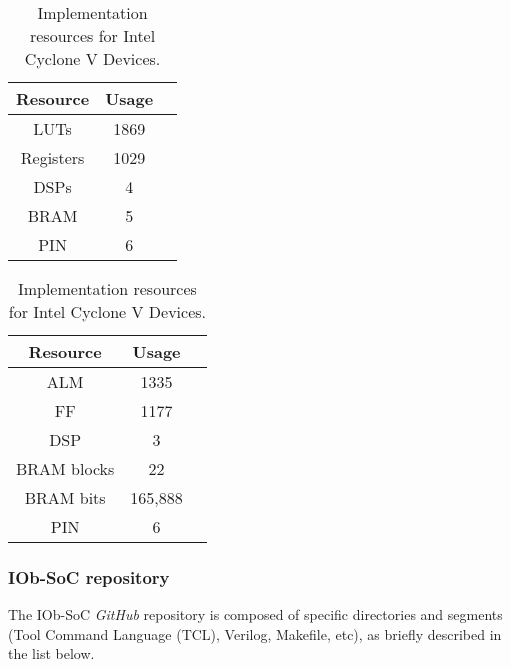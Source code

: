 \vspace{0.8cm}

\begin{table}[H]
\parbox{.45\linewidth}{
\centering
\begin{tabular}{|c|c|c|}
        \hline
         \textbf{Resource} & \textbf{Usage}  \\
         \hline
         LUTs & 1869 \\
         \hline
         Registers & 1029 \\
         \hline
         DSPs & 4 \\
         \hline
         BRAM & 5 \\
         \hline
         PIN & 6 \\
         \hline
\end{tabular}
\caption{Implementation resources for \textit{Xilinx Kintex
Ultrascale} Devices.}
\label{tab:resorucesxilinx}
}
\hfill
\parbox{.45\linewidth}{
\centering
\begin{tabular}{|c|c|c|}
        \hline
         \textbf{Resource} & \textbf{Usage}  \\
         \hline
         ALM & 1335 \\
         \hline
         FF & 1177 \\
         \hline
         DSP & 3 \\
         \hline
         BRAM blocks & 22 \\
         \hline
         BRAM bits & 165,888 \\
         \hline
         PIN & 6 \\
         \hline
\end{tabular}
\caption{Implementation resources for Intel Cyclone
V Devices.}
\label{tab:resorucescyclone}
}
\end{table}


\subsubsection{IOb-SoC repository}

The IOb-SoC \textit{GitHub} repository is composed of specific directories and segments (Tool Command Language (TCL), Verilog, Makefile, etc), as briefly described in the list below.

